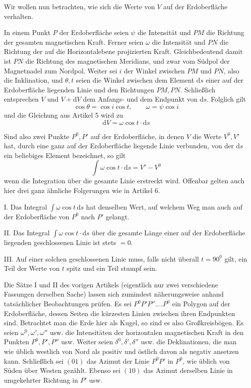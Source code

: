 Wir wollen nun betrachten, wie sich die Werte von $V$ auf der Erdoberfläche verhalten.

In einem Punkt $P$ der Erdoberfläche seien $\psi$ die Intensität und $PM$ die Richtung der gesamten magnetischen Kraft. Ferner seien $\omega$ die Intensität und $PN$ die Richtung der auf die Horizontalebene projizierten Kraft. Gleichbedeutend damit ist $PN$ die Richtung des magnetischen Meridians, und zwar vom Südpol der Magnetnadel zum Nordpol. Weiter sei $i$ der Winkel zwischen $PM$ und $PN$, also die Inklination, und $\theta,t$ seien die Winkel zwischen dem Element $\mathrm{d}s$ einer auf der Erdoberfläche liegenden Linie und den Richtungen $PM,PN$. Schließlich entsprechen $V$ und $V+\mathrm{d}V$ dem Anfangs- und dem Endpunkt von $\mathrm{d}s$. Folglich gilt
\[
\cos\theta=\cos i\cos t,\qquad \omega=\psi\cos i
\]
und die Gleichung aus Artikel 5 wird zu
\[
\mathrm{d}V=\omega\cos t\cdot\mathrm{d}s
\]

Sind also zwei Punkte $P^0,P'$ auf der Erdoberfläche, in denen $V$ die Werte $V^0,V'$ hat, durch eine ganz auf der Erdoberfläche liegende Linie verbunden, von der $\mathrm{d}s$ ein beliebiges Element bezeichnet, so gilt
\[
\int\omega\cos t\cdot\mathrm{d}s=V'-V^0
\]
wenn die Integration über die gesamte Linie erstreckt wird. Offenbar gelten auch hier drei ganz ähnliche Folgerungen wie in Artikel 6.

I. Das Integral $\int\omega\cos t\,\mathrm{d}s$ hat denselben Wert, auf welchem Weg man auch auf der Erdoberfläche von $P^0$ nach $P'$ gelangt.

II. Das Integral $\int\omega\cos t\cdot\mathrm{d}s$ über die gesamte Länge einer auf der Erdoberfläche liegenden geschlossenen Linie ist stets $=0$.

III. Auf einer solchen geschlossenen Linie muss, falls nicht überall $t=90^0$ gilt, ein Teil der Werte von $t$ spitz und ein Teil stumpf sein.

Die Sätze I und II des vorigen Artikels (eigentlich nur zwei verschiedene Fassungen derselben Sache) lassen sich zumindest näherungsweise anhand tatsächlicher Beobachtungen prüfen. Es sei $P^0P'P''....P^0$ ein Polygon auf der Erdoberfläche, dessen Seiten die kürzesten Linien zwischen ihren Endpunkten sind. Betrachtet man die Erde hier als Kugel, so sind es also Großkreisbögen. Es seien $\omega^0,\omega',\omega''$ usw. die Intensitäten der horizontalen magnetischen Kraft in den Punkten $P^0,P',P''$ usw. Weiter seien $\delta^0,\delta',\delta''$ usw. die Deklinationen, die man wie üblich westlich von Nord als positiv und östlich davon als negativ ansetzen kann. Schließlich sei $(01)$ das Azimut der Linie $P^0P'$ in $P^0$, wie üblich von Süden über Westen gezählt. Ebenso sei $(10)$ das Azimut derselben Linie in umgekehrter Richtung in $P'$ usw.

